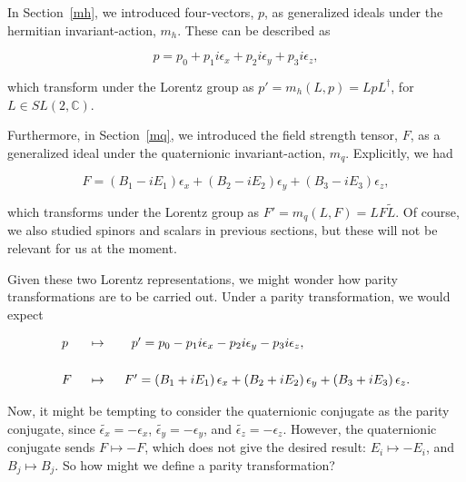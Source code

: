 \documentclass[letterpaper,12pt,titlepage,oneside,final]{book}
\newcommand{\C}{\mathbb{C}}
\begin{document}
In Section~\ref{mh}, we introduced four-vectors, $p$,  as generalized ideals under the hermitian invariant-action, $m_h$.   These can be described as 

\begin{equation}p =  p_0 + p_1i{\epsilon_x} +p_2i{\epsilon_y} + p_3i{\epsilon_z}, 
\end{equation}

\noindent which transform under the Lorentz group as $p' = m_h(L,p) = LpL^{\dagger}$, for $L\in SL(2,\C)$.



Furthermore, in Section~\ref{mq}, we introduced the  field strength tensor, $F$, as a generalized ideal under the quaternionic invariant-action, $m_q$.  Explicitly, we had

\begin{equation}F = \left( B_1 -iE_1\right){\epsilon_x} + \left( B_2-iE_2 \right){\epsilon_y}  + \left( B_3-iE_3  \right){\epsilon_z},
\end{equation}

\noindent which transforms under the Lorentz group as $F' =m_q(L, F)=LF\widetilde{L}$.  Of course, we also studied spinors and scalars in previous sections, but these will not be relevant for us at the moment.


Given these two Lorentz representations, we might wonder how parity transformations are to be carried out.  Under a parity transformation, we would expect

\begin{equation}\begin{array}{lll}p& \hspace{2mm}\mapsto& \hspace{2mm}p' =  p_0 - p_1i{\epsilon_x} -p_2i{\epsilon_y} - p_3i{\epsilon_z}, \vspace{6mm}\\
F&  \hspace{2mm}\mapsto\hspace{2mm}& F' = \left( B_1 +iE_1\right){\epsilon_x} + \left( B_2+iE_2 \right){\epsilon_y}  + \left( B_3+iE_3  \right){\epsilon_z}.
\end{array}
\end{equation}


Now, it might be tempting to consider the quaternionic conjugate as the parity conjugate, since $\widetilde{\epsilon_x} = -\epsilon_x$, $\widetilde{\epsilon_y} = -\epsilon_y$, and $\widetilde{\epsilon_z} = -\epsilon_z$.  However, the quaternionic conjugate sends $F\mapsto -F$, which does not give the desired result:  $E_i\mapsto-E_i$, and $B_j\mapsto B_j$.  So how might we define a parity transformation?
\end{document}
